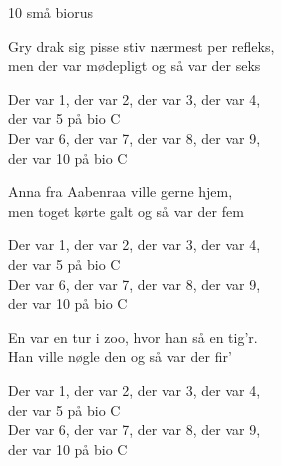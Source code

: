 \begin{song}{10 små biorus}{}
  \begin{SBVerse}
  Gry drak sig pisse stiv nærmest per refleks,\\
  men der var mødepligt og så var der seks
  \end{SBVerse}

  \begin{SBChorus}
  Der var 1, der var 2, der var 3, der var 4,\\
  der var 5 på bio C\\
  Der var 6, der var 7, der var 8, der var 9,\\
  der var 10 på bio C
  \end{SBChorus}


  \begin{SBVerse}
  Anna fra Aabenraa ville gerne hjem,\\
  men toget kørte galt og så var der fem
  \end{SBVerse}

  \begin{SBChorus}
  Der var 1, der var 2, der var 3, der var 4,\\
  der var 5 på bio C\\
  Der var 6, der var 7, der var 8, der var 9,\\
  der var 10 på bio C
  \end{SBChorus}


  \begin{SBVerse}
  En var en tur i zoo, hvor han så en tig’r.\\
  Han ville nøgle den og så var der fir’
  \end{SBVerse}

  \begin{SBChorus}
  Der var 1, der var 2, der var 3, der var 4,\\
  der var 5 på bio C\\
  Der var 6, der var 7, der var 8, der var 9,\\
  der var 10 på bio C
  \end{SBChorus}



\end{song}
